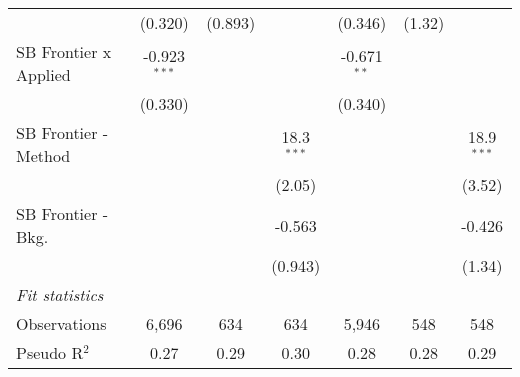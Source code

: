 \begin{tabular}{lcccccc}
                                  & (0.320)        & (0.893)       &                & (0.346)       & (1.32)         &   \\   
   SB Frontier x Applied          & -0.923$^{***}$ &               &                & -0.671$^{**}$ &                &   \\   
                                  & (0.330)        &               &                & (0.340)       &                &   \\   
   SB Frontier - Method           &                &               & 18.3$^{***}$   &               &                & 18.9$^{***}$\\   
                                  &                &               & (2.05)         &               &                & (3.52)\\   
   SB Frontier - Bkg.             &                &               & -0.563         &               &                & -0.426\\   
                                  &                &               & (0.943)        &               &                & (1.34)\\   
   \midrule
   \emph{Fit statistics}\\
   Observations                   & 6,696          & 634           & 634            & 5,946         & 548            & 548\\  
   Pseudo R$^2$                   & 0.27           & 0.29          & 0.30           & 0.28          & 0.28           & 0.29\\  
   

\end{tabular}
